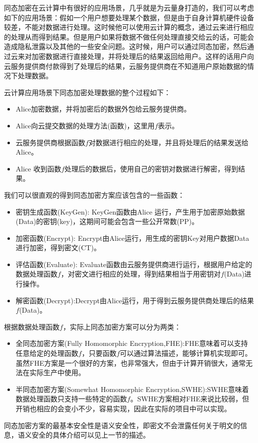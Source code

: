 同态加密在云计算中有很好的应用场景，几乎就是为云量身打造的，我们可以考虑如下的应用场景：假如一个用户想要处理某个数据，但是由于自身计算机硬件设备较差，不能对数据进行处理。这时候他可以使用云计算的概念，通过云来进行相应的处理从而得到结果。但是用户如果将数据不做任何处理直接交给云的话，可能会造成隐私泄露以及其他的一些安全问题。这时候，用户可以通过同态加密，然后通过云来对加密数据进行直接处理，并将处理后的结果返回给用户。这样的话用户向云服务提供商付款得到了处理后的结果，云服务提供商在不知道用户原始数据的情况下处理数据。

云计算应用场景下同态加密处理数据的整个过程如下：
\begin{itemize}
    \item Alice加密数据，并将加密后的数据外包给云服务提供商。
    \item Alice向云提交数据的处理方法(函数)，这里用$f$表示。
    \item 云服务提供商根据函数$f$对数据进行相应的处理，并且将处理后的结果发送给Alice。
    \item Alice 收到函数$f$处理后的数据后，使用自己的密钥对数据进行解密，得到结果。
\end{itemize}
我们可以很直观的得到同态加密方案应该包含的一些函数：
\begin{itemize}
    \item 密钥生成函数(KeyGen): KeyGen函数由Alice 运行，产生用于加密原始数据(Data)的密钥(key)，这期间可能会包含一些公开常数(PP)。
    \item 加密函数(Encrypt): Encrypt由Alice运行，用生成的密钥Key对用户数据Data进行加密，得到密文(CT)。
    \item 评估函数(Evaluate): Evaluate函数由云服务提供商进行运行，根据用户给定的数据处理函数$f$，对密文进行相应的处理，得到结果相当于用密钥对$f$(Data)进行操作。
    \item 解密函数(Decrypt):Decrypt由Alice运行，用于得到云服务提供商处理后的结果$f$(Data)。
\end{itemize}
根据数据处理函数$f$，实际上同态加密方案可以分为两类：
\begin{itemize}
    \item 全同态加密方案(Fully Homomorphic Encryption,FHE):FHE意味着可以支持任意给定的处理函数$f$，只要函数$f$可以通过算法描述，能够计算机实现即可。虽然FHE方案是一个很好的方案，也非常强大，但由于计算开销很大，通常无法在实际生产中使用。
    \item 半同态加密方案(Somewhat Homomorphic Encryption,SWHE):SWHE意味着数据处理函数只支持一些特定的函数$f$。SWHE方案相对FHE来说比较弱，但开销也相应的会变小不少，容易实现，因此在实际的项目中可以实现。
\end{itemize}
同态加密方案的最基本安全性是语义安全性，即密文不会泄露任何关于明文的信息，语义安全的具体介绍可以见上一节的描述。


